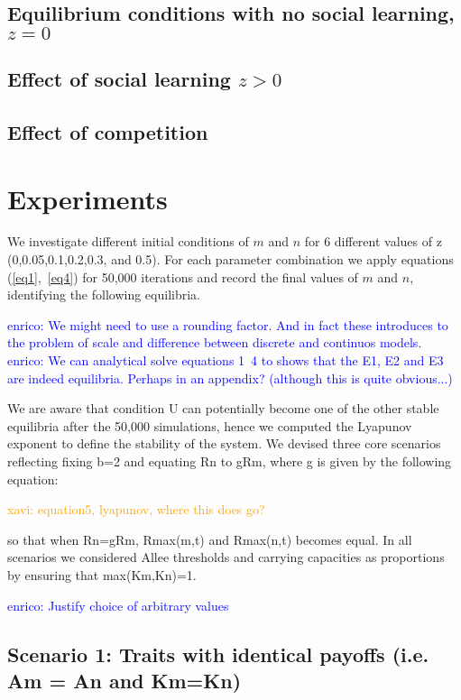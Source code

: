 \documentclass[preprint,authoryear]{elsarticle}
\newcommand{\memo}[2]{\textcolor{#1}{#2}}
\newcommand{\xavi}[1]{\memo{orange}{xavi: #1\\}}
\newcommand{\enrico}[1]{\memo{blue}{enrico: #1\\}}
\begin{document}
\subsection{Equilibrium conditions with no social learning, $z=0$}

\subsection{Effect of social learning $z>0$}

\subsection{Effect of competition}





\section{Experiments}

We investigate different initial conditions of $m$ and $n$ for 6 different values of z (0,0.05,0.1,0.2,0.3, and 0.5). For each parameter combination we apply equations (\ref{eq1},~\ref{eq4}) for 50,000 iterations and record the final values of $m$ and $n$, identifying the following equilibria.

\enrico{We might need to use a rounding factor. And in fact these introduces to the problem of scale and difference between discrete and continuos  models.}
\enrico{We can analytical solve equations 1~4 to shows that the E1, E2 and E3 are indeed equilibria. Perhaps in an appendix? (although this is quite obvious...)}

We are aware that condition U can potentially become one of the other stable equilibria after the 50,000 simulations, hence we computed the Lyapunov exponent to define the stability of the system. We devised three core scenarios reflecting fixing b=2 and equating Rn to gRm, where g is given by the following equation:

\xavi{equation5, lyapunov, where this does go?}

so that when Rn=gRm,  Rmax(m,t) and Rmax(n,t) becomes equal. In all scenarios we considered Allee thresholds and carrying capacities as proportions by ensuring that max(Km,Kn)=1.

\enrico{Justify choice of arbitrary values}

\subsection{Scenario 1: Traits with identical payoffs (i.e. Am = An   and Km=Kn)}
\end{document}

